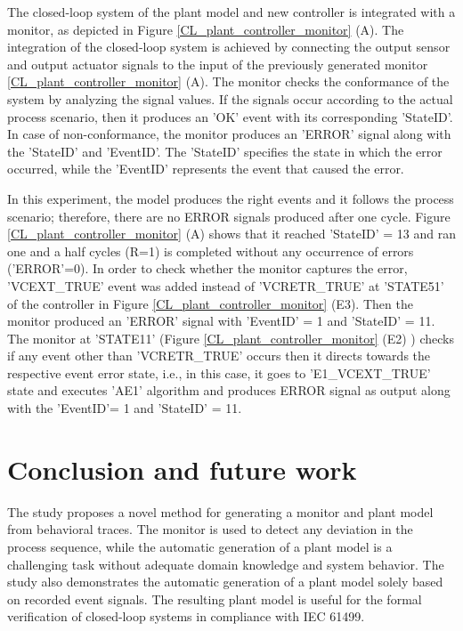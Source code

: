 \begin{bibunit}
The closed-loop system of the plant model and new controller is integrated with a monitor, as depicted in Figure \ref{CL_plant_controller_monitor} (A). The integration of the closed-loop system is achieved by connecting the output sensor and output actuator signals to the input of the previously generated monitor \ref{CL_plant_controller_monitor}  (A). The monitor checks the conformance of the system by analyzing the signal values. If the signals occur according to the actual process scenario, then it produces an 'OK' event with its corresponding 'StateID'. In case of non-conformance, the monitor produces an 'ERROR' signal along with the 'StateID' and 'EventID'. The 'StateID' specifies the state in which the error occurred, while the 'EventID' represents the event that caused the error.

In this experiment, the model produces the right events and it follows the process scenario; therefore, there are no ERROR signals produced after one cycle. Figure \ref{CL_plant_controller_monitor} (A) shows that it reached 'StateID' = 13 and ran one and a half cycles (R=1) is completed without any occurrence of errors ('ERROR'=0). In order to check whether the monitor captures the error,  'VCEXT\_TRUE' event was added instead of 'VCRETR\_TRUE' at 'STATE51' of the controller in Figure \ref{CL_plant_controller_monitor} (E3). Then the monitor produced an 'ERROR' signal with 'EventID' = 1 and 'StateID' = 11. The monitor at 'STATE11' (Figure \ref{CL_plant_controller_monitor} (E2) ) checks if any event other than 'VCRETR\_TRUE' occurs then it directs towards the respective event error state, i.e., in this case, it goes to 'E1\_VCEXT\_TRUE' state and executes 'AE1' algorithm and produces ERROR signal as output along with the 'EventID'= 1 and 'StateID' = 11.

\section{Conclusion and future work}
\label{cf}


The study proposes a novel method for generating a monitor and plant model from behavioral traces. The monitor is used to detect any deviation in the process sequence, while the automatic generation of a plant model is a challenging task without adequate domain knowledge and system behavior. The study also demonstrates the automatic generation of a plant model solely based on recorded event signals. The resulting plant model is useful for the formal verification of closed-loop systems in compliance with IEC 61499.


\end{bibunit}
